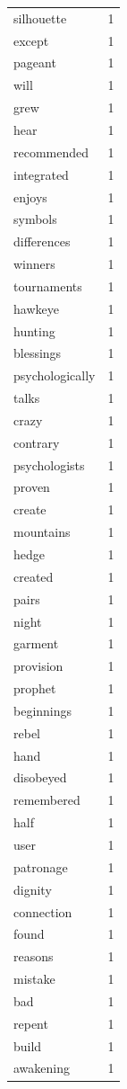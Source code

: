 \begin{tabular}{lr}
silhouette & 1 \\
except & 1 \\
pageant & 1 \\
will & 1 \\
grew & 1 \\
hear & 1 \\
recommended & 1 \\
integrated & 1 \\
enjoys & 1 \\
symbols & 1 \\
differences & 1 \\
winners & 1 \\
tournaments & 1 \\
hawkeye & 1 \\
hunting & 1 \\
blessings & 1 \\
psychologically & 1 \\
talks & 1 \\
crazy & 1 \\
contrary & 1 \\
psychologists & 1 \\
proven & 1 \\
create & 1 \\
mountains & 1 \\
hedge & 1 \\
created & 1 \\
pairs & 1 \\
night & 1 \\
garment & 1 \\
provision & 1 \\
prophet & 1 \\
beginnings & 1 \\
rebel & 1 \\
hand & 1 \\
disobeyed & 1 \\
remembered & 1 \\
half & 1 \\
user & 1 \\
patronage & 1 \\
dignity & 1 \\
connection & 1 \\
found & 1 \\
reasons & 1 \\
mistake & 1 \\
bad & 1 \\
repent & 1 \\
build & 1 \\
awakening & 1 \\

\end{tabular}
